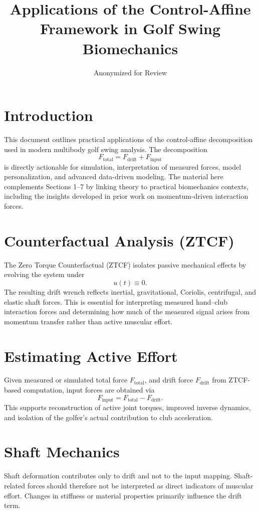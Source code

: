 \documentclass[12pt]{article}
\title{Applications of the Control-Affine Framework in Golf Swing Biomechanics}
\author{Anonymized for Review}
\date{}
\begin{document}
\maketitle

\section{Introduction}
This document outlines practical applications of the control-affine decomposition used in modern multibody golf swing analysis. The decomposition
\begin{equation}
F_{\text{total}} = F_{\mathrm{drift}} + F_{\mathrm{input}}
\end{equation}
is directly actionable for simulation, interpretation of measured forces, model personalization, and advanced data-driven modeling. The material here complements Sections 1--7 by linking theory to practical biomechanics contexts, including the insights developed in prior work on momentum-driven interaction forces.

\section{Counterfactual Analysis (ZTCF)}
The Zero Torque Counterfactual (ZTCF) isolates passive mechanical effects by evolving the system under
\begin{equation}
u(t) \equiv 0.
\end{equation}
The resulting drift wrench reflects inertial, gravitational, Coriolis, centrifugal, and elastic shaft forces. This is essential for interpreting measured hand--club interaction forces and determining how much of the measured signal arises from momentum transfer rather than active muscular effort.

\section{Estimating Active Effort}
Given measured or simulated total force $F_{\text{total}}$, and drift force $F_{\mathrm{drift}}$ from ZTCF-based computation, input forces are obtained via
\begin{equation}
F_{\mathrm{input}} = F_{\text{total}} - F_{\mathrm{drift}}.
\end{equation}
This supports reconstruction of active joint torques, improved inverse dynamics, and isolation of the golfer's actual contribution to club acceleration.

\section{Shaft Mechanics}
Shaft deformation contributes only to drift and not to the input mapping. Shaft-related forces should therefore not be interpreted as direct indicators of muscular effort. Changes in stiffness or material properties primarily influence the drift term.
\end{document}

